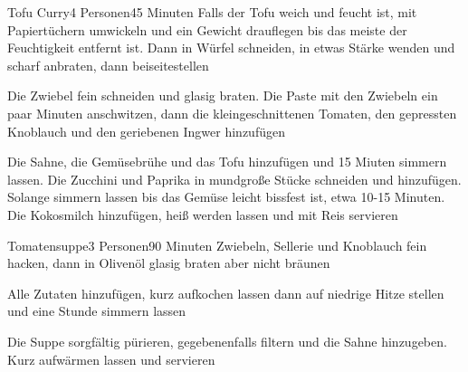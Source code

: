 \begin{recipe}{Tofu Curry}{4 Personen}{45 Minuten}
Falls der Tofu weich und feucht ist, mit Papiertüchern umwickeln und ein Gewicht drauflegen bis das meiste der Feuchtigkeit entfernt ist. Dann in Würfel schneiden, in etwas Stärke wenden und scharf anbraten, dann beiseitestellen

Die Zwiebel fein schneiden und glasig braten.
Die Paste mit den Zwiebeln ein paar Minuten anschwitzen, dann die kleingeschnittenen Tomaten, den gepressten Knoblauch und den geriebenen Ingwer hinzufügen

Die Sahne, die Gemüsebrühe und das Tofu hinzufügen und 15 Miuten simmern lassen.
Die Zucchini und Paprika in mundgroße Stücke schneiden und hinzufügen.
Solange simmern lassen bis das Gemüse leicht bissfest ist, etwa 10-15 Minuten.
Die Kokosmilch hinzufügen, heiß werden lassen und mit Reis servieren
\end{recipe}


\begin{recipe}{Tomatensuppe}{3 Personen}{90 Minuten}
Zwiebeln, Sellerie und Knoblauch fein hacken, dann in Olivenöl glasig braten aber nicht bräunen

Alle Zutaten hinzufügen, kurz aufkochen lassen dann auf niedrige Hitze stellen und eine Stunde simmern lassen

Die Suppe sorgfältig pürieren, gegebenenfalls filtern und die Sahne hinzugeben. Kurz aufwärmen lassen und servieren
\end{recipe}


